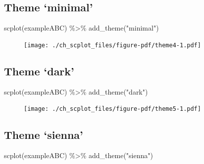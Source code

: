 \documentclass[
  letterpaper,
  DIV=11,
  numbers=noendperiod]{scrreprt}
\newenvironment{Shaded}{\begin{snugshade}}{\end{snugshade}}
\newcommand{\FunctionTok}[1]{\textcolor[rgb]{0.28,0.35,0.67}{#1}}
\newcommand{\NormalTok}[1]{\textcolor[rgb]{0.00,0.23,0.31}{#1}}
\newcommand{\SpecialCharTok}[1]{\textcolor[rgb]{0.37,0.37,0.37}{#1}}
\newcommand{\StringTok}[1]{\textcolor[rgb]{0.13,0.47,0.30}{#1}}
\begin{document}
\hypertarget{theme-minimal}{%
\subsection{Theme `minimal'}\label{theme-minimal}}

\begin{Shaded}
\begin{Highlighting}[]
\FunctionTok{scplot}\NormalTok{(exampleABC) }\SpecialCharTok{\%\textgreater{}\%}
  \FunctionTok{add\_theme}\NormalTok{(}\StringTok{"minimal"}\NormalTok{)}
\end{Highlighting}
\end{Shaded}

\begin{figure}[H]

{\centering \texttt{[image: ./ch\_scplot\_files/figure-pdf/theme4-1.pdf]}

}

\end{figure}

\hypertarget{theme-dark}{%
\subsection{Theme `dark'}\label{theme-dark}}

\begin{Shaded}
\begin{Highlighting}[]
\FunctionTok{scplot}\NormalTok{(exampleABC) }\SpecialCharTok{\%\textgreater{}\%}
  \FunctionTok{add\_theme}\NormalTok{(}\StringTok{"dark"}\NormalTok{)}
\end{Highlighting}
\end{Shaded}

\begin{figure}[H]

{\centering \texttt{[image: ./ch\_scplot\_files/figure-pdf/theme5-1.pdf]}

}

\end{figure}

\hypertarget{theme-sienna}{%
\subsection{Theme `sienna'}\label{theme-sienna}}

\begin{Shaded}
\begin{Highlighting}[]
\FunctionTok{scplot}\NormalTok{(exampleABC) }\SpecialCharTok{\%\textgreater{}\%}
  \FunctionTok{add\_theme}\NormalTok{(}\StringTok{"sienna"}\NormalTok{)}
\end{Highlighting}
\end{Shaded}
\end{document}
